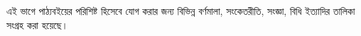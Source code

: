 \documentclass[../../include/open-logic-part]{subfiles}
\begin{document}

\begin{editorial}
  এই ভাগে পাঠ্যবইয়ের পরিশিষ্ট হিসেবে যোগ করার জন্য
  বিভিন্ন বর্ণমালা, সংকেতরীতি, সংজ্ঞা, বিধি ইত্যাদির
  তালিকা সংগ্রহ করা হয়েছে।
\end{editorial}



\OLEndPartHook
\end{document}

